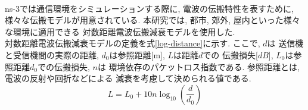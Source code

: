 \\[1em]
\indent ns-3では通信環境をシミュレーションする際に, 
電波の伝搬特性を表すために, 様々な伝搬モデルが用意されている. 
本研究では, 都市, 郊外, 屋内といった様々な環境に適用できる
対数距離電波伝搬減衰モデルを使用した.\\ 
\indent 対数距離電波伝搬減衰モデルの定義を式\ref{log-distance}に示す. ここで, $d$は
送信機と受信機間の実際の距離, $d_0$は参照距離[m], $L$は距離$d$での
伝搬損失[$dB$], $L_0$は参照距離$d_0$での伝搬損失, $n$は
環境依存のパケットロス指数である. 参照距離とは, 電波の反射や回折などによる
減衰を考慮して決められる値である. \\
\begin{equation}\label{log-distance}
  L = L_0 + 10n\log_{10}\left(\frac{d}{d_0}\right)
\end{equation}